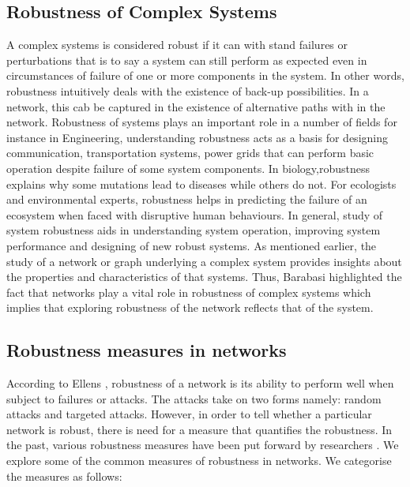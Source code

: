 \documentclass[10pt,a4paper]{article}
\begin{document}
\subsection{Robustness of Complex Systems}
	A complex systems is considered robust if it can with stand failures or perturbations that is to say a system can still perform as expected even in circumstances of failure of one or more components in the system. 
	In other words, robustness intuitively deals with the existence of back-up possibilities. In a network, this cab be captured in the existence of alternative paths with in the network.
	 Robustness of systems plays an important role in a number of fields for instance in Engineering, understanding robustness acts as a basis for designing communication, transportation systems, power grids that can perform basic operation despite failure of some system components. In biology,robustness explains why some mutations lead to diseases while others do not. For ecologists and environmental experts, robustness helps in predicting the failure of an ecosystem when faced with disruptive human behaviours. In general, study of system robustness aids in understanding system operation, improving system performance and designing of new robust systems. 
	As mentioned earlier, the study of a network or graph underlying a complex system provides insights about the properties and characteristics of that systems. Thus, Barabasi \citep{barabasi2016network} highlighted the fact that networks play a vital role in robustness of complex systems which implies that exploring robustness of the network reflects that of the system.
	 
	\subsection{Robustness measures in networks}
	According to Ellens \citep{ellens2013graph}, robustness of a network is its ability to perform well when subject to failures or attacks. The attacks take on two forms namely: random attacks and targeted attacks. However, in order to tell whether a particular network is robust, there is need for a measure that quantifies the robustness. In the past, various robustness measures have been put forward by researchers \citep{sydney2008elasticity}. We explore some of the common measures of robustness in networks. We categorise the measures as follows:
\end{document}
